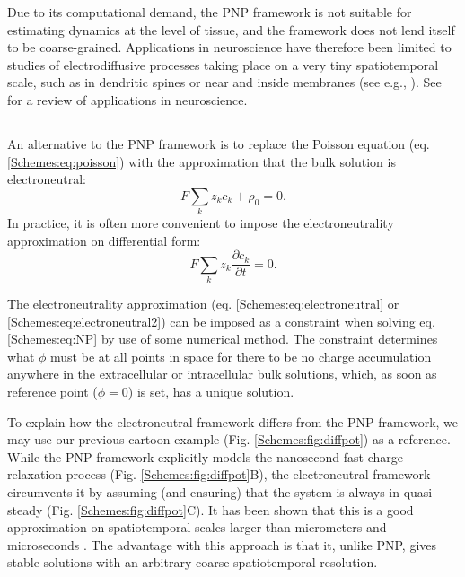 Due to its computational demand, the PNP framework is not suitable for estimating dynamics at the level of tissue, and the framework does not lend itself to be coarse-grained. Applications in neuroscience have therefore been limited to studies of electrodiffusive processes taking place on a very tiny spatiotemporal scale, such as in dendritic spines or near and inside membranes (see e.g., \cite{Leonetti2004, Lu2007, Lopreore2008, Nanninga2008, Gardner2011, Zheng2011, Pods2013, Gardner2015, lagache2019, cartailler2019}). See \cite{Savtchenko2017} for a review of applications in neuroscience.


\subsection{}
\label{sec:Schemes:electroneutral}
An alternative to the PNP framework is to replace the Poisson equation (eq. \ref{Schemes:eq:poisson}) with the approximation that the bulk solution is electroneutral:
\begin{equation}
F \sum_k z_k c_k + \rho_0 = 0.
\label{Schemes:eq:electroneutral}
\end{equation}
In practice, it is often more convenient to impose the electroneutrality approximation on differential form:
\begin{equation}
F \sum_k{z_k \frac{\partial c_k}{\partial t}} = 0.
\label{Schemes:eq:electroneutral2}
\end{equation}

The electroneutrality approximation (eq. \ref{Schemes:eq:electroneutral} or \ref{Schemes:eq:electroneutral2}) can be imposed as a constraint when solving eq.\ref{Schemes:eq:NP} by use of some numerical method. The constraint determines what $\phi$ must be at all points in space for there to be no charge accumulation anywhere in the extracellular or intracellular bulk solutions, which, as soon as reference point ($\phi = 0$) is set, has a unique solution.

To explain how the electroneutral framework differs from the PNP framework, we may use our previous cartoon example (Fig. \ref{Schemes:fig:diffpot}) as a reference. While the PNP framework explicitly models the nanosecond-fast charge relaxation process (Fig. \ref{Schemes:fig:diffpot}B), the electroneutral framework circumvents it by assuming (and ensuring) that the system is always in quasi-steady (Fig. \ref{Schemes:fig:diffpot}C). It has been shown that this is a good approximation on spatiotemporal scales larger than micrometers and microseconds \cite{Grodzinsky2011, Pods2017, Solbra2018}. The advantage with this approach is that it, unlike PNP, gives stable solutions with an arbitrary coarse spatiotemporal resolution.

